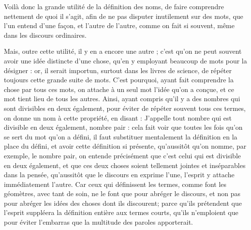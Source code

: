 Voilà donc la grande utilité de la définition des noms, de faire comprendre nettement de quoi il s'agit, afin de ne pas disputer inutilement sur des mots, que l'un entend d'une façon, et l'autre de l'autre, comme on fait si souvent, même dans les discours ordinaires.

Mais, outre cette utilité, il y en a encore une autre ; c'est qu'on ne peut souvent avoir une idée distincte d'une chose, qu'en y employant beaucoup de mots pour la désigner : or, il serait importun, surtout dans les livres de science, de répéter toujours cette grande suite de mots. C'est pourquoi, ayant fait comprendre la chose par tous ces mots, on attache à un seul mot l'idée qu'on a conçue, et ce mot tient lieu de tous les autres. Ainsi, ayant compris qu'il y a des nombres qui sont divisibles en deux également, pour éviter de répéter souvent tous ces termes, on donne un nom à cette propriété, en disant : J'appelle tout nombre qui est divisible en deux également, nombre pair : cela fait voir que toutes les fois qu'on se sert du mot qu'on a défini, il faut substituer mentalement la définition en la place du défini, et avoir cette définition si présente, qu'aussitôt qu'on nomme, par exemple, le nombre pair, on entende précisément que c'est celui qui est divisible en deux également, et que ces deux choses soient tellement jointes et inséparables dans la pensée, qu'aussitôt que le discours en exprime l'une, l'esprit y attache immédiatement l'autre. Car ceux qui définissent les termes, comme font les géomètres, avec tant de soin, ne le font que pour abréger le discours, et non pas pour abréger les idées des choses dont ils discourent; parce qu'ils prétendent que l'esprit suppléera la définition entière aux termes courts, qu'ils n'emploient que pour éviter l'embarras que la multitude des paroles apporterait.

